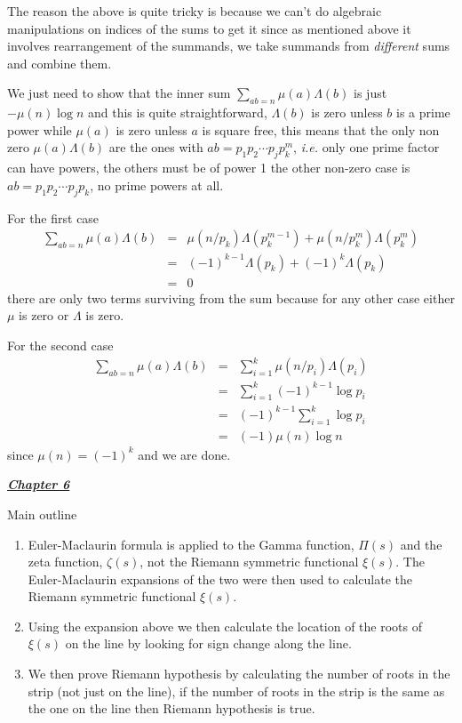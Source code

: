 \documentclass[aps,preprint,preprintnumbers,nofootinbib,showpacs,prd]{revtex4-1}
\newcommand{\ie}{{\it i.e.} }
\newcommand{\nbea}{\begin{eqnarray*}}
\newcommand{\neea}{\end{eqnarray*}}
\begin{document}
The reason the above is quite tricky is because we can't do algebraic manipulations on indices of the sums to get it since as mentioned above it involves rearrangement of the summands, we take summands from {\it different} sums and combine them.

We just need to show that the inner sum $\sum_{ab=n} \mu(a) \Lambda(b)$ is just $-\mu(n)\log n$ and this is quite straightforward, $\Lambda(b)$ is zero unless $b$ is a prime power while $\mu(a)$ is zero unless $a$ is square free, this means that the only non zero $\mu(a)\Lambda(b)$ are the ones with $ab = p_1 p_2 \cdots p_j p_k^m$, \ie only one prime factor can have powers, the others must be of power 1 the other non-zero case is $ab = p_1 p_2 \cdots p_j p_k$, no prime powers at all.

For the first case
%
\nbea
\sum_{ab=n} \mu(a) \Lambda(b) & = & \mu(n/p_k) \Lambda(p_k^{m-1}) + \mu(n/p_k^m) \Lambda(p_k^m) \\
& = & (-1)^{k-1} \Lambda(p_k) + (-1)^{k} \Lambda(p_k) \\
& = & 0
\neea
%
there are only two terms surviving from the sum because for any other case either $\mu$ is zero or $\Lambda$ is zero.

For the second case
%
\nbea
\sum_{ab=n} \mu(a) \Lambda(b) & = & \sum_{i=1}^k \mu(n/p_i)\Lambda(p_i) \\
& = & \sum_{i=1}^k (-1)^{k-1} \log p_i \\
& = & (-1)^{k-1} \sum_{i=1}^k \log p_i \\
& = & (-1) \mu(n) \log n
\neea
%
since $\mu(n) = (-1)^{k}$ and we are done.

\bigskip
\underline{\textbf{\textit{Chapter 6}}}
\bigskip

Main outline
%
\begin{enumerate}
\item Euler-Maclaurin formula is applied to the Gamma function, $\Pi(s)$ and the zeta function, $\zeta(s)$, not the Riemann symmetric functional $\xi(s)$. The Euler-Maclaurin expansions of the two were then used to calculate the Riemann symmetric functional $\xi(s)$.
%
\item Using the expansion above we then calculate the location of the roots of $\xi(s)$ on the line by looking for sign change along the line.
%
\item We then prove Riemann hypothesis by calculating the number of roots in the strip (not just on the line), if the number of roots in the strip is the same as the one on the line then Riemann hypothesis is true.
\end{enumerate}
%
\end{document}
